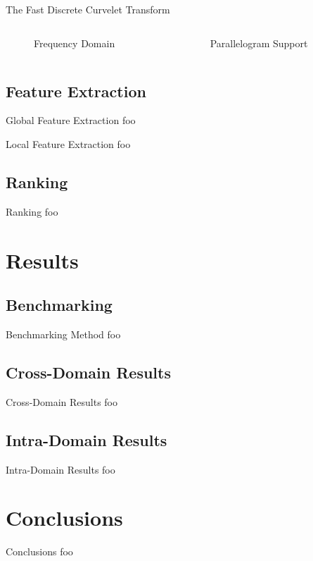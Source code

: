 \documentclass[mathserif]{beamer}
\begin{document}
\begin{frame}{The Fast Discrete Curvelet Transform}
    \begin{columns}
        \begin{column}{.5\textwidth}
            \begin{figure}
                
                \caption{Frequency Domain}
            \end{figure}
        \end{column}
        \begin{column}{.5\textwidth}
            \begin{figure}
                
                \caption{Parallelogram Support}
            \end{figure}
        \end{column}
    \end{columns}
\end{frame}

\subsection{Feature Extraction}
\begin{frame}{Global Feature Extraction}
    foo
\end{frame}

\begin{frame}{Local Feature Extraction}
    foo
\end{frame}

\subsection{Ranking}
\begin{frame}{Ranking}
    foo
\end{frame}

\section{Results}
\subsection{Benchmarking}
\begin{frame}{Benchmarking Method}
    foo
\end{frame}

\subsection{Cross-Domain Results}
\begin{frame}{Cross-Domain Results}
    foo
\end{frame}

\subsection{Intra-Domain Results}
\begin{frame}{Intra-Domain Results}
    foo
\end{frame}

\section{Conclusions}
\begin{frame}{Conclusions}
    foo
\end{frame}

\end{document}
